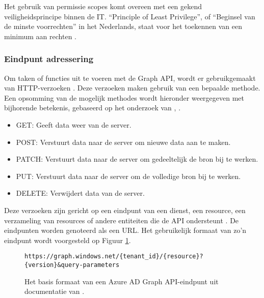 Het gebruik van permissie scopes komt overeen met een gekend veiligheidsprincipe binnen de \ac{IT}. “Principle of Least Privilege”, of “Beginsel van de minste voorrechten” in het Nederlands, staat voor het toekennen van een minimum aan rechten \autocite{Saltzer1975}. 



\subsubsection{Eindpunt adressering}

Om taken of functies uit te voeren met de Graph \ac{API}, wordt er gebruikgemaakt van \ac{HTTP}-verzoeken \autocite{Microsoft2015}. Deze verzoeken maken gebruik van een bepaalde methode. Een opsomming van de mogelijk methodes wordt hieronder weergegeven met bijhorende betekenis, gebaseerd op het onderzoek van \textcite{Fielding1999}, \textcite{Dusseault2010}.

\begin{itemize}
    \item GET: Geeft data weer van de server.
    \item POST: Verstuurt data naar de server om nieuwe data aan te maken.
    \item PATCH: Verstuurt data naar de server om gedeeltelijk de bron bij te werken.
    \item PUT: Verstuurt data naar de server om de volledige bron bij te werken.
    \item DELETE: Verwijdert data van de server.
\end{itemize}

Deze verzoeken zijn gericht op een eindpunt van een dienst, een resource, een verzameling van resources of andere entiteiten die de \ac{API} ondersteunt \autocite{Microsoft2015}. De eindpunten worden genoteerd als een \ac{URL}. Het gebruikelijk formaat van zo'n eindpunt wordt voorgesteld op Figuur \ref{bfe}. \\

\begin{figure}[h]
    \scriptsize\begin{verbatim}https://graph.windows.net/{tenant_id}/{resource}?{version}&query-parameters
    \end{verbatim}    
    \caption[Basis formaat Graph API-eindpunt]{Het basis formaat van een Azure \ac{AD} Graph \ac{API}-eindpunt uit documentatie van \textcite{Microsoft2023o}.}
    \label{bfe}
\end{figure}

